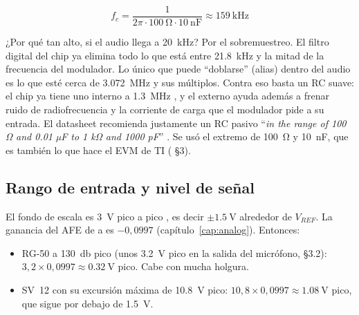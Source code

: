 \begin{calculo}
\[
f_c = \frac{1}{2\pi\cdot\SI{100}{\ohm}\cdot\SI{10}{\nano\farad}}\approx\SI{159}{\kilo\hertz}
\]
\end{calculo}

¿Por qué tan alto, si el audio llega a \SI{20}{\kilo\hertz}? Por el sobremuestreo. El filtro digital del chip ya elimina todo lo que está entre \SI{21.8}{\kilo\hertz} y la mitad de la frecuencia del modulador. Lo único que puede ``doblarse'' (alias) dentro del audio es lo que esté cerca de \SI{3.072}{\mega\hertz} y sus múltiplos. Contra eso basta un RC suave: el chip ya tiene uno interno a \SI{1.3}{\mega\hertz} , y el externo ayuda además a frenar ruido de radiofrecuencia y la corriente de carga que el modulador pide a su entrada. El datasheet recomienda justamente un RC pasivo ``\emph{in the range of 100 Ω and 0.01 µF to 1 kΩ and 1000 pF}'' . Se usó el extremo de \SI{100}{\ohm} y \SI{10}{\nano\farad}, que es también lo que hace el EVM de TI ( §3).

\subsection{Rango de entrada y nivel de señal}

\begin{calculo}
El fondo de escala es \SI{3}{\volt} pico a pico , es decir $\pm\SI{1.5}{\volt}$ alrededor de $V_{REF}$. La ganancia del AFE de  a  es $-0{,}0997$ (capítulo~\ref{cap:analog}). Entonces:
\begin{itemize}
  \item RG-50 a \SI{130}{\decibel} pico (unos \SI{3.2}{\volt} pico en la salida del micrófono,  §3.2): $3{,}2\times0{,}0997\approx\SI{0.32}{\volt}$ pico. Cabe con mucha holgura.
  \item SV~12 con su excursión máxima de \SI{10.8}{\volt} pico: $10{,}8\times0{,}0997\approx\SI{1.08}{\volt}$ pico, que sigue por debajo de \SI{1.5}{\volt}.
\end{itemize}
\end{calculo}

